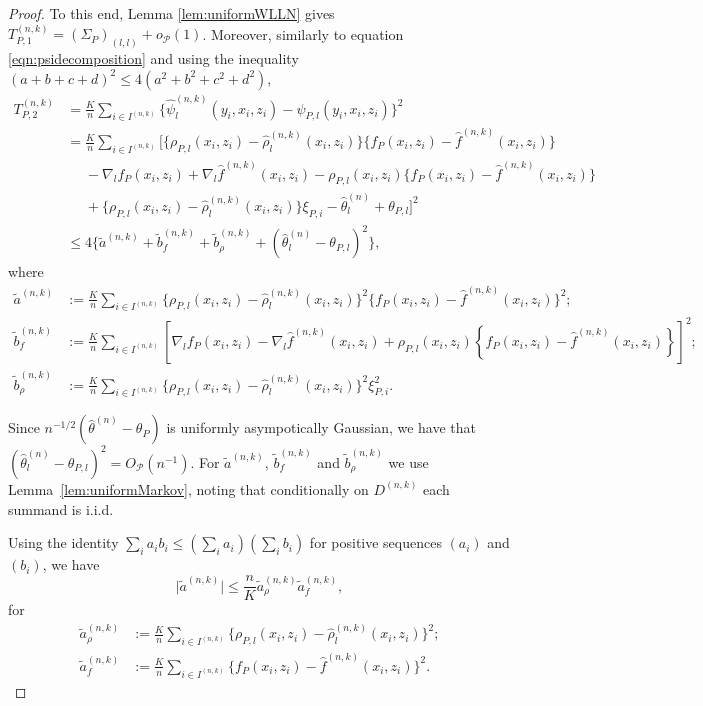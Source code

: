 \documentclass[aos]{imsart}
\begin{document}
\begin{proof}
		To this end, Lemma \ref{lem:uniformWLLN} gives $T_{P,1}^{(n,k)} = (\Sigma_{P})_{(l,l)} + o_\mathcal{P}(1)$.
		Moreover, similarly to equation \eqref{eqn:psidecomposition} and using the inequality $(a+b+c+d)^2\leq 4(a^2+b^2+c^2+d^2)$,
		\begin{align*}
			T_{P,2}^{(n,k)} &= \frac{K}{n} \sum_{i\in I^{(n,k)}} \Big\{\hat\psi_l^{(n,k)}(y_i,x_i,z_i)-\psi_{P,l}(y_i,x_i,z_i)\Big\}^2 \\
			&= \frac{K}{n} \sum_{i\in I^{(n,k)}} \Big[ \Big\{\rho_{P,l}(x_i,z_i)-\hat\rho_l^{(n,k)}(x_i,z_i)\Big\}\Big\{f_{P}(x_i,z_i)-\hat f^{(n,k)}(x_i,z_i)\Big\} \\
			& \phantom{=} - \nabla_l f_{P}(x_i,z_i)+\nabla_l \hat f^{(n,k)}(x_i,z_i) -\rho_{P,l}(x_i,z_i)\Big\{f_{P}(x_i,z_i)-\hat f^{(n,k)}(x_i,z_i)\Big\}\\
			& \phantom{=} + \Big\{\rho_{P,l}(x_i,z_i)-\hat\rho_l^{(n,k)}(x_i,z_i)\Big\} \xi_{P,i}  - \hat\theta_l^{(n)}+\theta_{P,l}\Big]^2 \\
			&\leq 4\{\tilde a^{(n,k)} + \tilde b_f^{(n,k)} + \tilde b_\rho^{(n,k)} + (\hat\theta_l^{(n)}-\theta_{P,l})^2\},
		\end{align*}
		where
		\begin{align*}
			\tilde a^{(n,k)}&:= \frac{K}{n} \sum_{i\in I^{(n,k)}} \Big\{\rho_{P,l}(x_i,z_i)-\hat\rho_l^{(n,k)}(x_i,z_i)\Big\}^2\Big\{f_P(x_i,z_i)-\hat f^{(n,k)}(x_i,z_i)\Big\}^2;\\
			\tilde b_f^{(n,k)}&:= \frac{K}{n} \sum_{i\in I^{(n,k)}} \left[\nabla_l f_P(x_i,z_i)-\nabla_l \hat f^{(n,k)}(x_i,z_i) +\rho_{P,l}(x_i,z_i)\left\{f_P(x_i,z_i)-\hat f^{(n,k)}(x_i,z_i)\right\}\right]^2;\\
			\tilde b_\rho^{(n,k)}&:= \frac{K}{n} \sum_{i\in I^{(n,k)}} \Big\{\rho_{P,l}(x_i,z_i)-\hat\rho_l^{(n,k)}(x_i,z_i)\Big\}^2 \xi_{P,i}^2.
		\end{align*}
		
		Since $n^{-1/2}(\hat\theta^{(n)}-\theta_P)$ is uniformly asympotically Gaussian, we have that $(\hat\theta_l^{(n)}-\theta_{P,l})^2=O_\mathcal{P}(n^{-1})$. For $\tilde a^{(n,k)}$, $\tilde b_f^{(n,k)}$ and $\tilde b_\rho^{(n,k)}$ we use Lemma~\ref{lem:uniformMarkov}, noting that conditionally on $D^{(n,k)}$ each summand is i.i.d.
		
		Using the identity $\sum_i a_i b_i \leq (\sum_i a_i)(\sum_i b_i) $ for positive sequences $(a_i)$ and $(b_i)$, we have
		\begin{equation*}
			\big|\tilde a^{(n,k)}\big| \leq \frac{n}{K} \tilde a_\rho^{(n,k)} \tilde a_f^{(n,k)},
		\end{equation*}
		for \begin{align*}
			\tilde a_\rho^{(n,k)}&:= \frac{K}{n} \sum_{i\in I^{(n,k)}} \Big\{\rho_{P,l}(x_i,z_i)-\hat\rho_l^{(n,k)}(x_i,z_i)\Big\}^2;\\
			\tilde a_f^{(n,k)}&:= \frac{K}{n} \sum_{i\in I^{(n,k)}} \Big\{f_P(x_i,z_i)-\hat f^{(n,k)}(x_i,z_i)\Big\}^2.
		\end{align*}
		

\end{proof}
\end{document}
